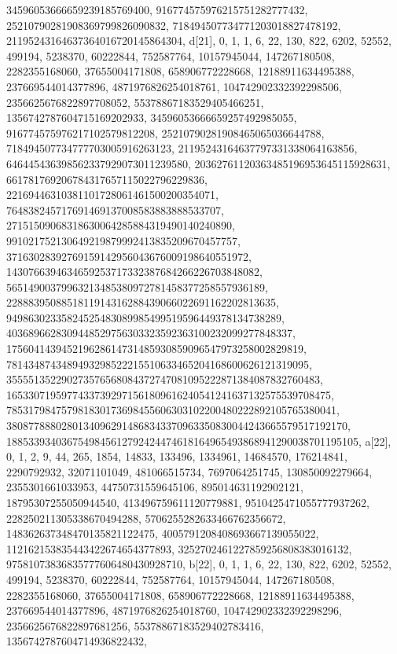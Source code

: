 {{{   34596053666659239185769400, 916774575976215751282777432, 
   25210790281908369799826090832, 718494507734771203018827478192, 
   21195243164637364016720145864304}}, 
 {d[21], {0, 1, 1, 6, 22, 130, 822, 6202, 52552, 499194, 5238370, 60222844, 
   752587764, 10157945044, 147267180508, 2282355168060, 37655004171808, 
   658906772228668, 12188911634495388, 237669544014377896, 
   4871976826254018761, 104742902332392298506, 2356625676822897708052, 
   55378867183529405466251, 1356742787604715169202933, 
   34596053666659257492985055, 916774575976217102579812208, 
   25210790281908465065036644788, 718494507734777703005916263123, 
   21195243164637797331338064163856, 646445436398562337929073011239580, 
   20362761120363485196953645115928631, 661781769206784317657115022796229836, 
   22169446310381101728061461500200354071, 
   764838245717691469137008583883888533707, 
   27151509068318630064285884319490140240890, 
   991021752130649219879992413835209670457757, 
   37163028392769159142956043676009198640551972, 
   1430766394634659253717332387684266226703848082, 
   56514900379963213485380972781458377258557936189, 
   2288839508851811914316288439066022691162202813635, 
   94986302335824525483089985499519596449378134738289, 
   4036896628309448529756303323592363100232099277848337, 
   175604143945219628614731485930859096547973258002829819, 
   7814348743489493298522215510633465204168600626121319095, 
   355551352290273576568084372747081095222871384087832760483, 
   16533071959774337392971561809616240541241637132575539708475, 
   785317984757981830173698455606303102200480222892105765380041, 
   38087788802801340962914868343370963350830044243665579517192170, 
   1885339340367549845612792424474618164965493868941290038701195105}}, 
 {a[22], {0, 1, 2, 9, 44, 265, 1854, 14833, 133496, 1334961, 14684570, 
   176214841, 2290792932, 32071101049, 481066515734, 7697064251745, 
   130850092279664, 2355301661033953, 44750731559645106, 895014631192902121, 
   18795307255050944540, 413496759611120779881, 9510425471055777937262, 
   228250211305338670494288, 5706255282633466762356672, 
   148362637348470135821122475, 4005791208408693667139055022, 
   112162153835443422674654377893, 3252702461227859256808383016132, 
   97581073836835777606480430928710}}, 
 {b[22], {0, 1, 1, 6, 22, 130, 822, 6202, 52552, 499194, 5238370, 60222844, 
   752587764, 10157945044, 147267180508, 2282355168060, 37655004171808, 
   658906772228668, 12188911634495388, 237669544014377896, 
   4871976826254018760, 104742902332392298296, 2356625676822897681256, 
   55378867183529402783416, 1356742787604714936822432, 
}}}
